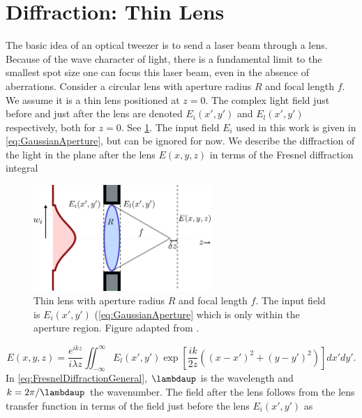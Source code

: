 \section{Diffraction: Thin Lens}\label{sec:DiffractionLimit}

The basic idea of an optical tweezer is to send a laser beam through a lens.
Because of the wave character of light, there is a fundamental limit to the smallest spot size one can focus this laser beam, even in the absence of aberrations.
Consider a circular lens with aperture radius $R$ and focal length $f$.
We assume it is a thin lens positioned at $z=0$.
The complex light field just before and just after the lens are denoted $E_i(x',y')$ and $E_l(x',y')$ respectively, both for $z=0$.
See \cref{fig:LensAperture}.
The input field $E_i$ used in this work is given in \cref{eq:GaussianAperture}, but can be ignored for now.
We describe the diffraction of the light in the plane after the lens $E(x,y,z)$ in terms of the Fresnel diffraction integral \cite{Goodman2005}

\begin{figure}
	\centering
	\includegraphics[width=0.6\textwidth]{figures/lens.pdf}
	\caption{Thin lens with aperture radius $R$ and focal length $f$. 
	The input field is $E_i(x',y')$ (\cref{eq:GaussianAperture} which is only within the aperture region. Figure adapted from \cite{Leseleuc2018,Gu2000}.}
	\label{fig:LensAperture}
\end{figure}

\begin{equation}\label{eq:FresnelDiffractionGeneral}
    E(x,y,z) = 
    \frac{e^{ikz}}{i \lambda z} \iint_{-\infty}^{\infty} E_l(x',y') \exp{\left[\frac{ik}{2z}\left((x-x')^2+(y-y')^2\right)\right]} dx'dy'.
\end{equation}
In \cref{eq:FresnelDiffractionGeneral}, $\lambdaup$ is the wavelength and $k=2\pi/\lambdaup$ the wavenumber.
The field after the lens follows from the lens transfer function in terms of the field just before the lens $E_i(x',y')$ as \cite{Goodman2005}

